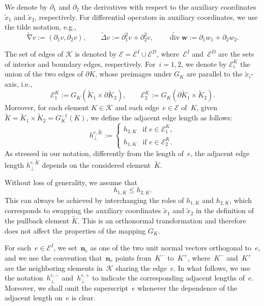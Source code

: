 \documentclass[a4paper,twoside,10pt]{article}
\DeclareMathOperator{\Div}{div}
\DeclareMathOperator{\grad}{\nabla}
\newcommand{\calE}{\mathcal{E}}
\newcommand{\calK}{\mathcal{K}}
\newcommand{\bn}{\mathbf{n}}
\newcommand{\bw}{\boldsymbol{w}}
\numberwithin{equation}{section}
\newcommand{\hperp}{h_{\perp}}
\newcommand{\Kt}{\widetilde{K}}
\newcommand{\hKot}{h_{1,K}}
\newcommand{\hKtt}{h_{2,K}}
\newcommand{\xt}{\widetilde{x}}
\begin{document}
	We denote by $\partial_1$ and $\partial_2$ the derivatives with respect to the auxiliary coordinates $\xt_1$ and $\xt_2$, respectively.
	For differential operators in auxiliary coordinates, we use the tilde notation, e.g.,\ 
	\begin{equation*}
	    \widetilde{\grad} v := (\partial_1 v, \partial_2 v), 
        \qquad 
         \widetilde{\Delta} v := \partial_1^2 v + \partial_2^2 v,
        \qquad \widetilde{\Div} \bw := \partial_1 w_1 + \partial_2 w_2. 
	\end{equation*}
	
	The set of edges of $\calK$ is denoted by $\calE = \calE^I \cup \calE^D$, where~$\calE^I$ and~$\calE^D$ are the sets of interior and boundary edges, respectively.
	For~$i = 1,2$, we denote by $\calE_i^K$ the union of the two edges of $\partial K$, whose preimages under $G_K$ are parallel to the $\widetilde x_i$-axis, i.e.,\
		\begin{equation*}
			\calE_1^K:=G_K(\Kt_1 \times \partial \Kt_2), \qquad \calE_2^K:=G_K(\partial \Kt_1 \times \Kt_2).
		\end{equation*}
	Moreover, for each element $K\in\calK$ and each edge~$e\in \calE$ of~$K$, 
    given $\Kt = \Kt_1 \times \Kt_2 =G_K^{-1}(K)$, we define the adjacent edge length as follows:
	\begin{equation*}
	    \hperp^{e, \Kt} :=
		\begin{cases}
			\hKtt &  \text{if } e\in\calE^K_1,\\
	        \hKot &   \text{if } e 
	        \in\calE^K_2.
		\end{cases}
	\end{equation*}
	As stressed in our notation, differently from the length of~$e$, the adjacent edge length $\hperp^{e,\Kt}$ depends on the considered element~$\Kt$.
	
	Without loss of generality, we assume that
	\begin{equation}\label{eq:anisotropicity}
		\hKot \le \hKtt.
	\end{equation}
	This can always be achieved by interchanging the roles of $\hKot$ and $\hKtt$, which corresponds to swapping the auxiliary coordinates $\widetilde x_1$ and $\widetilde x_2$ in the definition of the pullback element $\Kt$. This is an orthonormal transformation and therefore does not affect the properties of the mapping $G_K$. 

	For each~$e \in\calE^I$, 
	we set~$\bn_e$ as one of the two unit normal vectors orthogonal to~$e$, and we use the convention that~$\bn_e$ points from~$K^-$ to~$K^+$, where~$K^-$ and~$K^+$ are the neighboring elements in~$\calK$ sharing the edge~$e$.
	In what follows, we use the notation~$\hperp^{e, -}$ and~$\hperp^{e, +}$ to indicate the corresponding adjacent lengths of~$e$.
	Moreover, we 
	shall omit the superscript~$e$ whenever the dependence of the adjacent length
	on~$e$ is clear.
	
\end{document}
